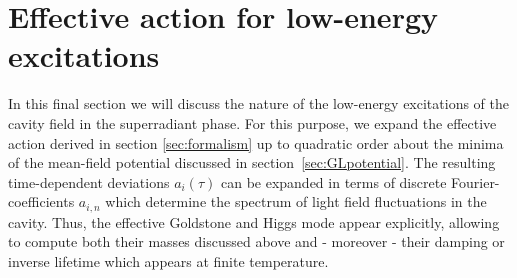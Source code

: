 \documentclass[12pt]{iopart}
\begin{document}
\section{Effective action for low-energy
  excitations}
\label{sec:low-energy-fluctuations}

In this final section we will discuss the nature of the low-energy
excitations of the cavity field in the superradiant phase. For this purpose, 
we expand the effective action derived in section \ref{sec:formalism} up to quadratic order
about the minima of the mean-field potential discussed in section~\ref{sec:GLpotential}. 
The resulting time-dependent deviations $a_i(\tau)$ can be expanded in terms
of discrete Fourier-coefficients  $a_{i,n}$ which determine the spectrum of 
light field fluctuations in the cavity. Thus, the effective Goldstone 
and Higgs mode appear explicitly, allowing 
to compute both their masses discussed above and - moreover - their damping 
or inverse lifetime which appears at finite temperature. \\
\end{document}
